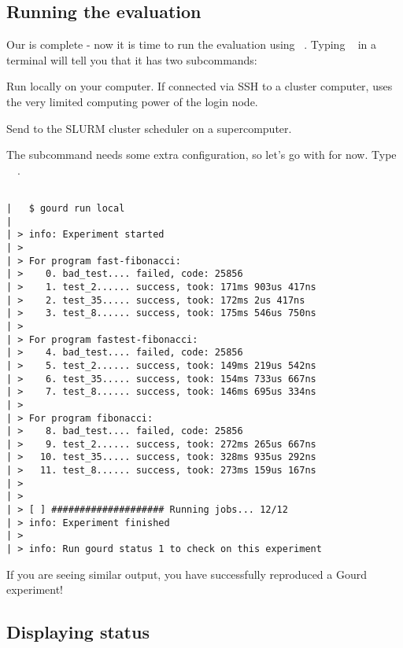 \documentclass[a4paper,english]{article}
\begin{document}
\begin{adjustwidth}{18pt}{0pt}
    \subsection{Running the evaluation}

    Our  is complete - now it is time to run the evaluation
    using ~.
    Typing ~ in a terminal
    will tell you that it has two subcommands:

    \begin{Description}[subcommands]\setlength{\itemsep}{0cm}
    \item[\Arg{local}] Run locally on your computer.
    If connected via SSH to a
      cluster computer,  uses the very limited computing power of
      the login node.
    \item[\Arg{slurm}] Send to the SLURM cluster scheduler on a supercomputer.
    \end{Description}

    The  subcommand needs some extra configuration, so let's go with
     for now.
    Type ~~.

    \begin{verbatim}

|   $ gourd run local
|
| > info: Experiment started
| >
| > For program fast-fibonacci:
| >    0. bad_test.... failed, code: 25856
| >    1. test_2...... success, took: 171ms 903us 417ns
| >    2. test_35..... success, took: 172ms 2us 417ns
| >    3. test_8...... success, took: 175ms 546us 750ns
| >
| > For program fastest-fibonacci:
| >    4. bad_test.... failed, code: 25856
| >    5. test_2...... success, took: 149ms 219us 542ns
| >    6. test_35..... success, took: 154ms 733us 667ns
| >    7. test_8...... success, took: 146ms 695us 334ns
| >
| > For program fibonacci:
| >    8. bad_test.... failed, code: 25856
| >    9. test_2...... success, took: 272ms 265us 667ns
| >   10. test_35..... success, took: 328ms 935us 292ns
| >   11. test_8...... success, took: 273ms 159us 167ns
| >
| >
| > [ ] #################### Running jobs... 12/12
| > info: Experiment finished
| >
| > info: Run gourd status 1 to check on this experiment

    \end{verbatim}

    If you are seeing similar output, you have successfully reproduced a Gourd experiment!

    \subsection{Displaying status}


\end{adjustwidth}
\end{document}
